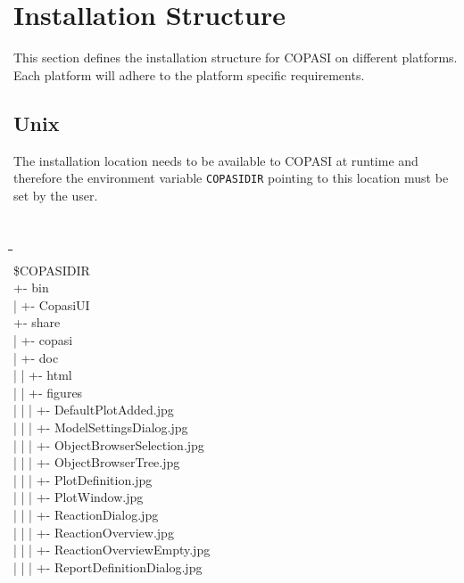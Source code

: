\documentclass[12pt]{book}
\begin{document}
\chapter{Installation Structure}
This section defines the installation structure for COPASI on
different platforms. Each platform will adhere to the platform
specific requirements. 

\section{Unix}
The installation location needs to be available to COPASI at runtime
and therefore the environment variable {\tt COPASIDIR} pointing to this
location must be set by the user. 
{\tt \scriptsize
\begin{tabbing}
 \hspace{4 pt}\=\hspace{17 pt}\=\hspace{17 pt}\=\hspace{17
 pt}\=\hspace{17 pt}\=\hspace{17 pt}\= \\ [-12 pt]
 \$COPASIDIR \\
 \> +- bin \\
 \> | \> +- CopasiUI \\
 \> +- share \\
 \> | \> +- copasi \\
 \> | \> \> +- doc \\
 \> | \> \> | \> +- html \\
 \> | \> \> | \> \> +- figures \\
 \> | \> \> | \> \> | \> +- DefaultPlotAdded.jpg \\
 \> | \> \> | \> \> | \> +- ModelSettingsDialog.jpg \\
 \> | \> \> | \> \> | \> +- ObjectBrowserSelection.jpg \\
 \> | \> \> | \> \> | \> +- ObjectBrowserTree.jpg \\
 \> | \> \> | \> \> | \> +- PlotDefinition.jpg \\
 \> | \> \> | \> \> | \> +- PlotWindow.jpg \\
 \> | \> \> | \> \> | \> +- ReactionDialog.jpg \\
 \> | \> \> | \> \> | \> +- ReactionOverview.jpg \\
 \> | \> \> | \> \> | \> +- ReactionOverviewEmpty.jpg \\
 \> | \> \> | \> \> | \> +- ReportDefinitionDialog.jpg \\

\end{tabbing}}
\end{document}
